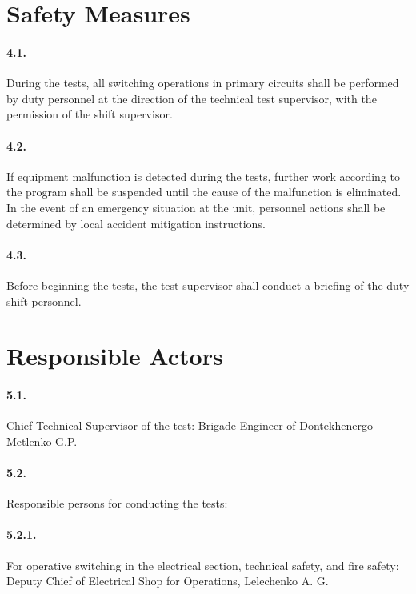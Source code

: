 \documentclass[openright]{bookest}
\begin{document}
\section*{Safety Measures}

\paragraph{4.1.} During the tests, all switching operations in primary circuits shall be performed by duty personnel at the direction of the technical test supervisor, with the permission of the shift supervisor.

\paragraph{4.2.} If equipment malfunction is detected during the tests, further work according to the program shall be suspended until the cause of the malfunction is eliminated. In the event of an emergency situation at the unit, personnel actions shall be determined by local accident mitigation instructions.

\paragraph{4.3.} Before beginning the tests, the test supervisor shall conduct a briefing of the duty shift personnel.

\section*{Responsible Actors}

\paragraph{5.1.} Chief Technical Supervisor of the test: Brigade Engineer of Dontekhenergo Metlenko G.P.

\paragraph{5.2.} Responsible persons for conducting the tests:

\paragraph{5.2.1.} For operative switching in the electrical section, technical safety, and fire safety: Deputy Chief of Electrical Shop for Operations, Lelechenko A. G.
\end{document}
